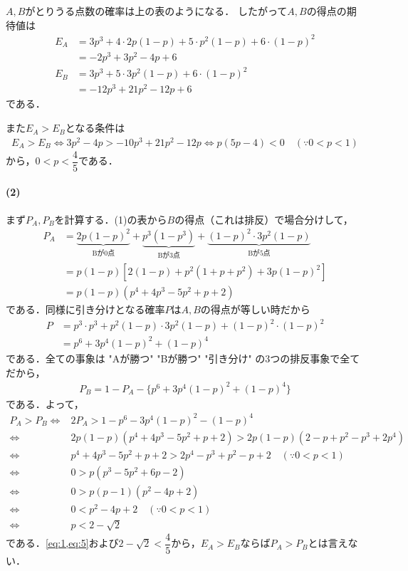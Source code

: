 \documentclass[../../main.tex]{subfiles}
\begin{document}
$A,B$がとりうる点数の確率は上の表のようになる．
したがって$A,B$の得点の期待値は
\begin{align}
  E_A
  &= 3p^3 + 4 \cdot 2p(1-p) + 5 \cdot p^2(1-p) + 6 \cdot (1-p)^2 \\
  &= -2p^3 + 3p^2 - 4p + 6 \\
  E_B
  &= 3p^3 + 5 \cdot 3p^2(1-p) + 6 \cdot (1-p)^2\\
  &= -12p^3 + 21p^2 - 12p + 6
\end{align}
である．

また$E_A>E_B$となる条件は
\begin{align}
  E_A > E_B \Leftrightarrow 3p^2 - 4p > -10p^3 + 21p^2 - 12p \Leftrightarrow p(5p-4) < 0 \quad (\because 0 < p < 1) \label{eq:1}
\end{align}
から，$0 < p < \dfrac{4}{5}$である．

\paragraph{(2)}

まず$P_A,P_B$を計算する．(1)の表から$B$の得点（これは排反）で場合分けして，
\begin{align}
  P_A
  & = \underbrace{2p(1-p)^2}_{\text{Bが0点}} + \underbrace{p^3(1-p^3)}_{\text{Bが3点}} + \underbrace{(1-p)^2 \cdot 3p^2(1-p)}_{\text{Bが5点}} \\
  & = p(1-p) \left[ 2(1-p) + p^2(1+p+p^2) + 3p(1-p)^2 \right] \\
  & = p(1-p) (p^4 + 4p^3 - 5p^2 + p + 2) \label{eq:2}
\end{align}
である．同様に引き分けとなる確率$P$は$A,B$の得点が等しい時だから
\begin{align}
  P
  & =  p^3 \cdot p^3 + p^2(1-p) \cdot 3p^2(1-p) + (1-p)^2 \cdot (1-p)^2 \\
  & = p^6 + 3p^4(1-p)^2 + (1-p)^4 \label{eq:3}
\end{align}
である．全ての事象は "Aが勝つ" "Bが勝つ" "引き分け" の3つの排反事象で全てだから，
\begin{align}
  P_B =  1 - P_A - \{ p^6 + 3p^4(1-p)^2 + (1-p)^4 \} \label{eq:4}
\end{align}
である．よって，
\begin{align}
  P_A > P_B
  \Leftrightarrow
  & 2P_A > 1 - p^6 - 3p^4(1-p)^2 - (1-p)^4 \\
  \Leftrightarrow
  & 2p(1-p)(p^4 + 4p^3 - 5p^2 + p + 2) > 2p(1-p)(2 - p + p^2 - p^3 + 2p^4) \\
  \Leftrightarrow
  & p^4 + 4p^3 - 5p^2 + p + 2 > 2p^4 - p^3 + p^2 - p + 2 \quad (\because 0 < p < 1) \\
  \Leftrightarrow
  & 0 > p(p^3 - 5p^2 + 6p - 2) \\
  \Leftrightarrow
  & 0 > p(p-1)(p^2 - 4p + 2) \\
  \Leftrightarrow
  & 0 < p^2 - 4p + 2 \quad (\because 0<p<1) \\
  \Leftrightarrow
  & p < 2-\sqrt{2} \label{eq:5}
\end{align}
である．\cref{eq:1,eq:5}および$2-\sqrt{2} < \dfrac{4}{5}$から，$E_A>E_B$ならば$P_A>P_B$とは言えない．
\end{document}
